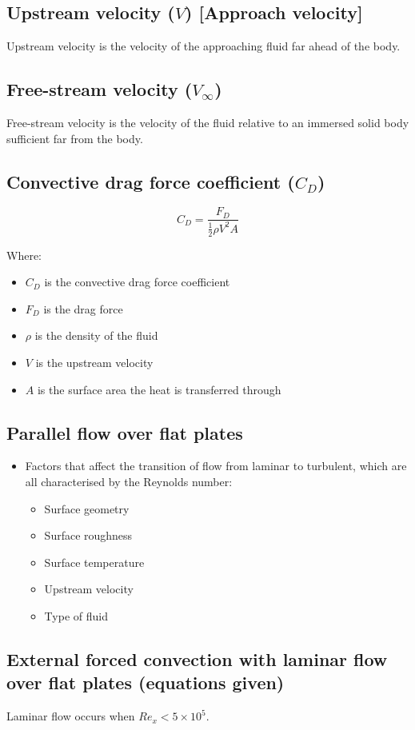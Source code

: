 \documentclass[11pt]{article}
\begin{document}
\subsection{Upstream velocity (\(V\)) [Approach velocity]}
\label{sec:org769c857}
Upstream velocity is the velocity of the approaching fluid far ahead of the body.
\subsection{Free-stream velocity (\(V_{\infty}\))}
\label{sec:org5db5522}
Free-stream velocity is the velocity of the fluid relative to an immersed solid body sufficient far from the body.

 \newpage
\subsection{Convective drag force coefficient (\(C_D\))}
\label{sec:orgbd6210b}
\[C_D = \frac{F_D}{\frac{1}{2} \rho V^2 A}\]

Where:
\begin{itemize}
\item \(C_D\) is the convective drag force coefficient
\item \(F_D\) is the drag force
\item \(\rho\) is the density of the fluid
\item \(V\) is the upstream velocity
\item \(A\) is the surface area the heat is transferred through
\end{itemize}
\subsection{Parallel flow over flat plates}
\label{sec:orgfe04549}
\begin{itemize}
\item Factors that affect the transition of flow from laminar to turbulent, which are all characterised by the Reynolds number:
\begin{itemize}
\item Surface geometry
\item Surface roughness
\item Surface temperature
\item Upstream velocity
\item Type of fluid
\end{itemize}
\end{itemize}
\subsection{External forced convection with laminar flow over flat plates (equations given)}
\label{sec:org2cc46bb}
Laminar flow occurs when \(Re_x < 5 \times 10^5\).
\end{document}
